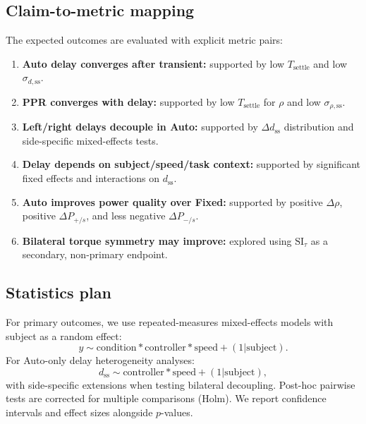 \documentclass[lettersize,journal]{IEEEtran}
\begin{document}
\subsection{Claim-to-metric mapping}
The expected outcomes are evaluated with explicit metric pairs:
\begin{enumerate}
\item \textbf{Auto delay converges after transient:} supported by low $T_{\text{settle}}$ and low $\sigma_{d,\text{ss}}$.
\item \textbf{PPR converges with delay:} supported by low $T_{\text{settle}}$ for $\rho$ and low $\sigma_{\rho,\text{ss}}$.
\item \textbf{Left/right delays decouple in Auto:} supported by $\Delta d_{\text{ss}}$ distribution and side-specific mixed-effects tests.
\item \textbf{Delay depends on subject/speed/task context:} supported by significant fixed effects and interactions on $d_{\text{ss}}$.
\item \textbf{Auto improves power quality over Fixed:} supported by positive $\Delta\rho$, positive $\Delta P_{+/s}$, and less negative $\Delta P_{-/s}$.
\item \textbf{Bilateral torque symmetry may improve:} explored using $\mathrm{SI}_{\tau}$ as a secondary, non-primary endpoint.
\end{enumerate}

\subsection{Statistics plan}
For primary outcomes, we use repeated-measures mixed-effects models with subject as a random effect:
\begin{equation}
y \sim \text{condition} * \text{controller} * \text{speed} + (1|\text{subject}).
\end{equation}
For Auto-only delay heterogeneity analyses:
\begin{equation}
d_{\text{ss}} \sim \text{controller} * \text{speed} + (1|\text{subject}),
\end{equation}
with side-specific extensions when testing bilateral decoupling.
Post-hoc pairwise tests are corrected for multiple comparisons (Holm). We report confidence intervals and effect sizes alongside $p$-values.
\end{document}
